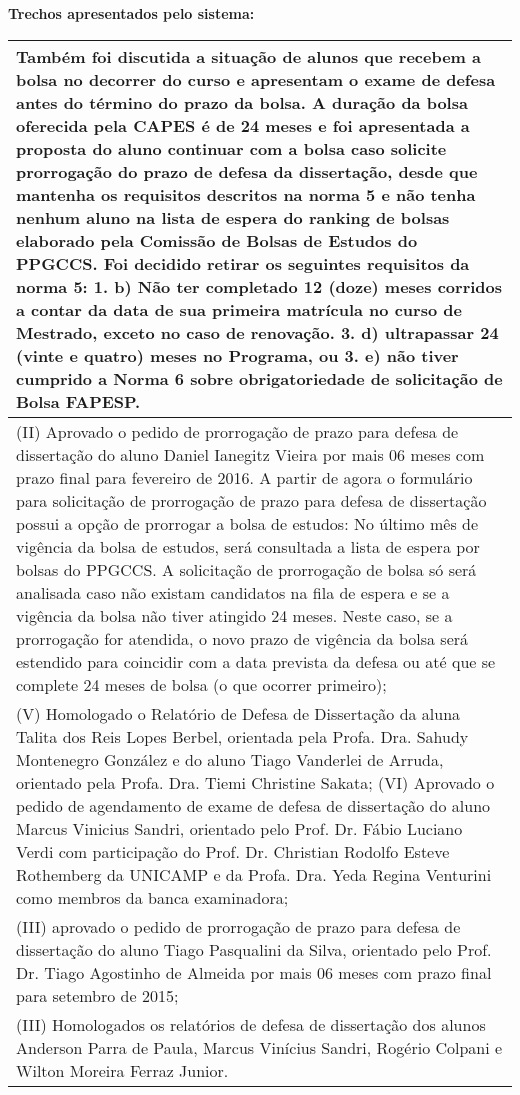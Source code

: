 \noindent
\textbf{Trechos apresentados pelo sistema:}
\begin{longtable}{|p{17.5cm}|}
\hline 
Também foi discutida a situação de alunos que recebem a bolsa no decorrer do curso e apresentam o exame de defesa antes do término do prazo da bolsa. A duração da bolsa oferecida pela CAPES é de 24 meses e foi apresentada a proposta do aluno continuar com a bolsa caso solicite prorrogação do prazo de defesa da dissertação, desde que mantenha os requisitos descritos na norma 5 e não tenha nenhum aluno na lista de espera do ranking de bolsas elaborado pela Comissão de Bolsas de Estudos do PPGCCS. Foi decidido retirar os seguintes requisitos da norma 5: 1. b) Não ter completado 12 (doze) meses corridos a contar da data de sua primeira matrícula no curso de Mestrado, exceto no caso de renovação. 3. d) ultrapassar 24 (vinte e quatro) meses no Programa, ou 3. e) não tiver cumprido a Norma 6 sobre obrigatoriedade de solicitação de Bolsa FAPESP.

 \\ \hline 
(II) Aprovado o pedido de prorrogação de prazo para defesa de dissertação do aluno Daniel Ianegitz Vieira por mais 06 meses com prazo final para fevereiro de 2016. A partir de agora o formulário para solicitação de prorrogação de prazo para defesa de dissertação possui a opção de prorrogar a bolsa de estudos: No último mês de vigência da bolsa de estudos, será consultada a lista de espera por bolsas do PPGCCS. A solicitação de prorrogação de bolsa só será analisada caso não existam candidatos na fila de espera e se a vigência da bolsa não tiver atingido 24 meses. Neste caso, se a prorrogação for atendida, o novo prazo de vigência da bolsa será estendido para coincidir com a data prevista da defesa ou até que se complete 24 meses de bolsa (o que ocorrer primeiro);
 \\ \hline 
(V) Homologado o Relatório de Defesa de Dissertação da aluna Talita dos Reis Lopes Berbel, orientada pela Profa. Dra. Sahudy Montenegro González e do aluno Tiago Vanderlei de Arruda, orientado pela Profa. Dra. Tiemi Christine Sakata; (VI) Aprovado o pedido de agendamento de exame de defesa de dissertação do aluno Marcus Vinicius Sandri, orientado pelo Prof. Dr. Fábio Luciano Verdi com participação do Prof. Dr. Christian Rodolfo Esteve Rothemberg da UNICAMP e da Profa. Dra. Yeda Regina Venturini como membros da banca examinadora;
 \\ \hline 
(III) aprovado o pedido de prorrogação de prazo para defesa de dissertação do aluno Tiago Pasqualini da Silva, orientado pelo Prof. Dr. Tiago Agostinho de Almeida por mais 06 meses com prazo final para setembro de 2015;
 \\ \hline 
(III) Homologados os relatórios de defesa de dissertação dos alunos Anderson Parra de Paula, Marcus Vinícius Sandri, Rogério Colpani e Wilton Moreira Ferraz Junior.


\end{longtable}
